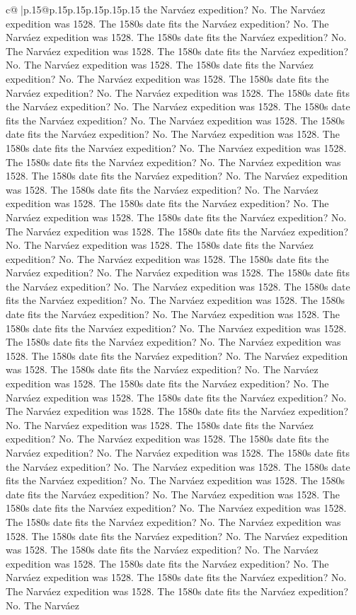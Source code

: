 \documentclass{article}
\begin{document}
{\begin{supertabular}{c@{$\;$}|p{.15\linewidth}@{}p{.15\linewidth}p{.15\linewidth}p{.15\linewidth}p{.15\linewidth}p{.15\linewidth}}
{{{the Narváez expedition? No. The Narváez expedition was 1528. The 1580s date fits the Narváez expedition? No. The Narváez expedition was 1528. The 1580s date fits the Narváez expedition? No. The Narváez expedition was 1528. The 1580s date fits the Narváez expedition? No. The Narváez expedition was 1528. The 1580s date fits the Narváez expedition? No. The Narváez expedition was 1528. The 1580s date fits the Narváez expedition? No. The Narváez expedition was 1528. The 1580s date fits the Narváez expedition? No. The Narváez expedition was 1528. The 1580s date fits the Narváez expedition? No. The Narváez expedition was 1528. The 1580s date fits the Narváez expedition? No. The Narváez expedition was 1528. The 1580s date fits the Narváez expedition? No. The Narváez expedition was 1528. The 1580s date fits the Narváez expedition? No. The Narváez expedition was 1528. The 1580s date fits the Narváez expedition? No. The Narváez expedition was 1528. The 1580s date fits the Narváez expedition? No. The Narváez expedition was 1528. The 1580s date fits the Narváez expedition? No. The Narváez expedition was 1528. The 1580s date fits the Narváez expedition? No. The Narváez expedition was 1528. The 1580s date fits the Narváez expedition? No. The Narváez expedition was 1528. The 1580s date fits the Narváez expedition? No. The Narváez expedition was 1528. The 1580s date fits the Narváez expedition? No. The Narváez expedition was 1528. The 1580s date fits the Narváez expedition? No. The Narváez expedition was 1528. The 1580s date fits the Narváez expedition? No. The Narváez expedition was 1528. The 1580s date fits the Narváez expedition? No. The Narváez expedition was 1528. The 1580s date fits the Narváez expedition? No. The Narváez expedition was 1528. The 1580s date fits the Narváez expedition? No. The Narváez expedition was 1528. The 1580s date fits the Narváez expedition? No. The Narváez expedition was 1528. The 1580s date fits the Narváez expedition? No. The Narváez expedition was 1528. The 1580s date fits the Narváez expedition? No. The Narváez expedition was 1528. The 1580s date fits the Narváez expedition? No. The Narváez expedition was 1528. The 1580s date fits the Narváez expedition? No. The Narváez expedition was 1528. The 1580s date fits the Narváez expedition? No. The Narváez expedition was 1528. The 1580s date fits the Narváez expedition? No. The Narváez expedition was 1528. The 1580s date fits the Narváez expedition? No. The Narváez expedition was 1528. The 1580s date fits the Narváez expedition? No. The Narváez expedition was 1528. The 1580s date fits the Narváez expedition? No. The Narváez expedition was 1528. The 1580s date fits the Narváez expedition? No. The Narváez expedition was 1528. The 1580s date fits the Narváez expedition? No. The Narváez expedition was 1528. The 1580s date fits the Narváez expedition? No. The Narváez expedition was 1528. The 1580s date fits the Narváez expedition? No. The Narváez expedition was 1528. The 1580s date fits the Narváez expedition? No. The Narváez expedition was 1528. The 1580s date fits the Narváez expedition? No. The Narváez expedition was 1528. The 1580s date fits the Narváez expedition? No. The Narváez }}}
\end{supertabular}}
\end{document}
